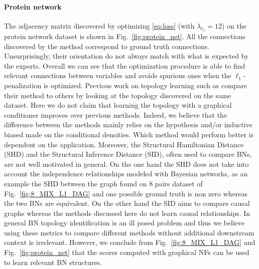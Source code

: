 \documentclass[twoside]{article}
\newcommand{\figref}[1]{Fig.~\ref{#1}}
\begin{document}
\paragraph{Protein network}
The adjacency matrix discovered by optimizing \eqref{eq:loss} (with $ \lambda_{\ell_1} = 12$) on the protein network dataset is shown in \figref{fig:protein_net}. All the connections discovered by the method correspond to ground truth connections. Unsurprisingly, their orientation do not always match with what is expected by the experts. Overall we can see that the optimization procedure is able to find relevant connections between variables and avoids spurious ones when the $\ell_1$-penalization is optimized. Previous work on topology learning such as \cite{DAG-1,DAG-2, DAG-3} compare their method to others by looking at the topology discovered on the same dataset. Here we do not claim that learning the topology with a graphical conditioner improves over previous methods. Indeed, we believe that the difference between the methods mainly relies on the hypothesis and/or inductive biased made on the conditional densities. Which method would perform better is dependent on the application. Moreover, the Structural Hamiltonian Distance (SHD) and the Structural Inference Distance (SID), often used to compare BNs, are not well motivated in general. On the one hand the SHD does not take into account the independence relationships modeled with Bayesian networks, as an example the SHD between the graph found on 8 pairs dataset of \figref{fig:8_MIX_L1_DAG} and one possible ground truth is non zero whereas the two BNs are equivalent. On the other hand the SID aims to compare causal graphs whereas the methods discussed here do not learn causal relationships. In general BN topology identification is an ill posed problem and thus we believe using these metrics to compare different methods without additional downstream context is irrelevant. However, we conclude from \figref{fig:8_MIX_L1_DAG} and \figref{fig:protein_net} that the scores computed with graphical NFs can be used to learn relevant BN structures.%
\end{document}
